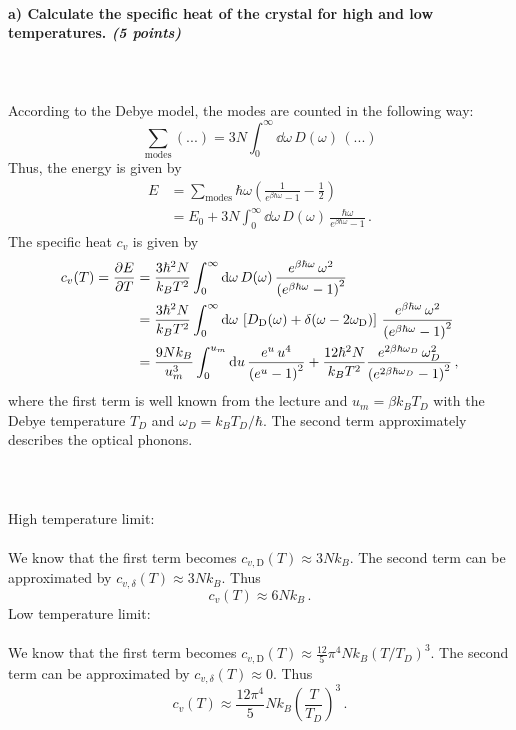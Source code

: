 \paragraph{a) Calculate the specific heat of the crystal for high and 
    low temperatures. \textit{(5 points)}
} \ \\
\\
    According to the Debye model, the modes are counted in the following way:
    \begin{equation}
	\sum_{\text{modes}} (...)
        =3N \int_0^{\infty}\dd\omega\, D(\omega)\, (...)
    \end{equation}
    Thus, the energy is given by
    \begin{align}
        E
        &=\sum_{\text{modes}}\hbar\omega
        \left(\frac{1}{e^{\beta\hbar\omega}-1}-\frac{1}{2}\right) \\
	&=E_0+3N\int_0^{\infty} \dd\omega\, D(\omega)\, 
        \frac{\hbar\omega}{e^{\beta\hbar\omega}-1} \,.
    \end{align}
    The specific heat $c_v$ is given by
    \begin{align}
	c_v(T)=\frac{\partial E}{\partial T}
	&=\frac{3\hbar^2N}{k_B T^2} \int_0^{\infty} \mathrm{d}\omega \, D(\omega) \, 
	    \frac{e^{\beta\hbar\omega} \, 
            \omega^2}{\left(e^{\beta\hbar\omega}-1\right)^2} \notag \\
	&= \frac{3\hbar^2N}{k_B T^2} \int_0^{\infty} \mathrm{d}\omega \, 
	    \left[ D_\textnormal{D}(\omega)+
            \delta(\omega-2\omega_\textnormal{D}) \right] \, 
	    \frac{e^{\beta\hbar\omega} \, 
            \omega^2}{\left(e^{\beta\hbar\omega}-1\right)^2} \notag \\
	&= \frac{9Nk_B}{u_m^3} \int_0^{u_m} \mathrm{d} u \, 
            \frac{e^u \, u^4}{\left(e^u-1\right)^2}+\frac{12\hbar^2N}{k_B T^2}  
	    \frac{e^{2\beta\hbar\omega_D} \,
            \omega_D^2}{\left(e^{2\beta\hbar\omega_D}-1\right)^2} \,,
    \end{align}
    where the first term is well known from the lecture and 
    $u_m = \beta k_B T_D$ with the Debye temperature $T_D$ and 
    $\omega_D = k_B T_D / \hbar$. The second term approximately describes the 
    optical phonons. \\
    \\
    \\
    \\
    High temperature limit: \\
    \\
    We know that the first term becomes $c_{v,\text{D}}(T)\approx 3Nk_B$. The 
    second term can be approximated by $c_{v,\delta}(T)\approx 3Nk_B$. Thus
    \begin{equation}
	c_{v}(T) \approx 6Nk_B \,.
    \end{equation}
    Low temperature limit: \\
    \\
    We know that the first term becomes 
    $c_{v,\text{D}}(T)\approx\frac{12}{5}\pi^4Nk_B (T/T_D)^3$. The second term 
    can be approximated by $c_{v,\delta}(T)\approx 0$. Thus
    \begin{equation}
	c_{v}(T)\approx\frac{12\pi^4}{5}N k_B\left(\frac{T}{T_D}\right)^3 \,.
    \end{equation}
